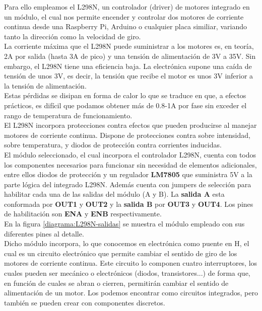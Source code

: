 Para ello empleamos el L298N, un controlador (driver) de motores integrado en un módulo, el cual nos permite encender y controlar dos motores de corriente continua desde una Raspberry Pi, Arduino o
cualquier placa similiar, variando tanto la dirección como la velocidad de giro.\\

La corriente máxima que el L298N puede suministrar a los motores es, en teoría, 2A por salida (hasta 3A de pico) y una tensión de alimentación de 3V a 35V. Sin embargo, el L298N tiene una 
eficiencia baja. La electrónica supone una caída de tensión de unos 3V, es decir, la tensión que recibe el motor es unos 3V inferior a la tensión de alimentación.\\

Estas pérdidas se disipan en forma de calor lo que se traduce en que, a efectos prácticos, es difícil que podamos obtener más de 0.8-1A por fase sin exceder el rango de temperatura de funcionamiento.\\

El L298N incorpora protecciones contra efectos que pueden producirse al manejar motores de corriente continua. Dispone de protecciones contra sobre intensidad, sobre temperatura, y diodos de protección
contra corrientes inducidas.\\

El módulo seleccionado, el cual incorpora el controlador L298N, cuenta con todos los componentes necesarios para funcionar sin necesidad de elementos adicionales, entre ellos diodos de protección
y un regulador \textbf{LM7805} que suministra 5V a la parte lógica del integrado L298N. Además cuenta con jumpers de selección para habilitar cada una de las salidas del módulo (A y B).
La \textbf{salida A} esta conformada por \textbf{OUT1} y \textbf{OUT2} y la \textbf{salida B} por \textbf{OUT3} y \textbf{OUT4}. Los pines de habilitación son \textbf{ENA} y \textbf{ENB} respectivamente.\\

En la figura \ref{diagrama:L298N-salidas} se muestra el módulo empleado con sus diferentes pines al detalle.\\

Dicho módulo incorpora, lo que conocemos en electrónica como puente en H, el cual es un circuito electrónico que permite cambiar el sentido de giro de los 
motores de corriente continua. Este circuito lo componen cuatro interruptores, los cuales pueden ser mecánico o electrónicos (diodos, transistores...) de forma que,
en función de cuales se abran o cierren, permitirán cambiar el sentido de alimentación de un motor.  Los podemos encontrar como circuitos integrados, pero también se
pueden crear con componentes discretos.

